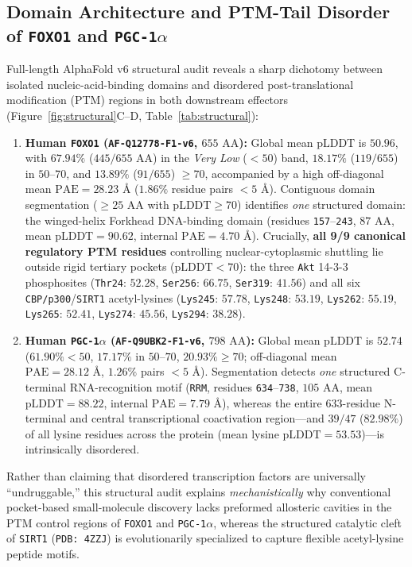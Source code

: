 \documentclass[11pt]{article}
\theoremstyle{plain}
\theoremstyle{remark}
\begin{document}
\subsection{Domain Architecture and PTM-Tail Disorder of \texttt{FOXO1} and \texorpdfstring{\texttt{PGC-1$\alpha$}}{PGC-1a}}
Full-length AlphaFold v6 structural audit reveals a sharp dichotomy between isolated nucleic-acid-binding domains and disordered post-translational modification (PTM) regions in both downstream effectors (Figure~\ref{fig:structural}C--D, Table~\ref{tab:structural}):
\begin{enumerate}
  \item \textbf{Human \texttt{FOXO1} (\texttt{AF-Q12778-F1-v6}, $655\text{ AA}$):} Global mean $\mathrm{pLDDT}$ is $50.96$, with $67.94\%$ ($445/655\text{ AA}$) in the \emph{Very Low} ($<50$) band, $18.17\%$ ($119/655$) in $50\text{--}70$, and $13.89\%$ ($91/655$) $\ge 70$, accompanied by a high off-diagonal mean $\mathrm{PAE} = 28.23\text{ \AA}$ ($1.86\%$ residue pairs $<5\text{ \AA}$). Contiguous domain segmentation ($\ge 25\text{ AA}$ with $\mathrm{pLDDT} \ge 70$) identifies \emph{one} structured domain: the winged-helix Forkhead DNA-binding domain (residues \texttt{157}--\texttt{243}, $87\text{ AA}$, mean $\mathrm{pLDDT} = 90.62$, internal $\mathrm{PAE} = 4.70\text{ \AA}$). Crucially, \textbf{all 9/9 canonical regulatory PTM residues} controlling nuclear-cytoplasmic shuttling lie outside rigid tertiary pockets ($\mathrm{pLDDT} < 70$): the three \texttt{Akt} 14-3-3 phosphosites (\texttt{Thr24}: $52.28$, \texttt{Ser256}: $66.75$, \texttt{Ser319}: $41.56$) and all six \texttt{CBP/p300}/\texttt{SIRT1} acetyl-lysines (\texttt{Lys245}: $57.78$, \texttt{Lys248}: $53.19$, \texttt{Lys262}: $55.19$, \texttt{Lys265}: $52.41$, \texttt{Lys274}: $45.56$, \texttt{Lys294}: $38.28$).
  \item \textbf{Human \texttt{PGC-1$\alpha$} (\texttt{AF-Q9UBK2-F1-v6}, $798\text{ AA}$):} Global mean $\mathrm{pLDDT}$ is $52.74$ ($61.90\% < 50$, $17.17\%$ in $50\text{--}70$, $20.93\% \ge 70$; off-diagonal mean $\mathrm{PAE} = 28.12\text{ \AA}$, $1.26\%$ pairs $<5\text{ \AA}$). Segmentation detects \emph{one} structured C-terminal RNA-recognition motif (\texttt{RRM}, residues \texttt{634}--\texttt{738}, $105\text{ AA}$, mean $\mathrm{pLDDT} = 88.22$, internal $\mathrm{PAE} = 7.79\text{ \AA}$), whereas the entire $633$-residue N-terminal and central transcriptional coactivation region---and $39/47$ ($82.98\%$) of all lysine residues across the protein (mean lysine $\mathrm{pLDDT} = 53.53$)---is intrinsically disordered.
\end{enumerate}
Rather than claiming that disordered transcription factors are universally ``undruggable,'' this structural audit explains \emph{mechanistically} why conventional pocket-based small-molecule discovery lacks preformed allosteric cavities in the PTM control regions of \texttt{FOXO1} and \texttt{PGC-1$\alpha$}, whereas the structured catalytic cleft of \texttt{SIRT1} (\texttt{PDB: 4ZZJ}) is evolutionarily specialized to capture flexible acetyl-lysine peptide motifs.
\end{document}
